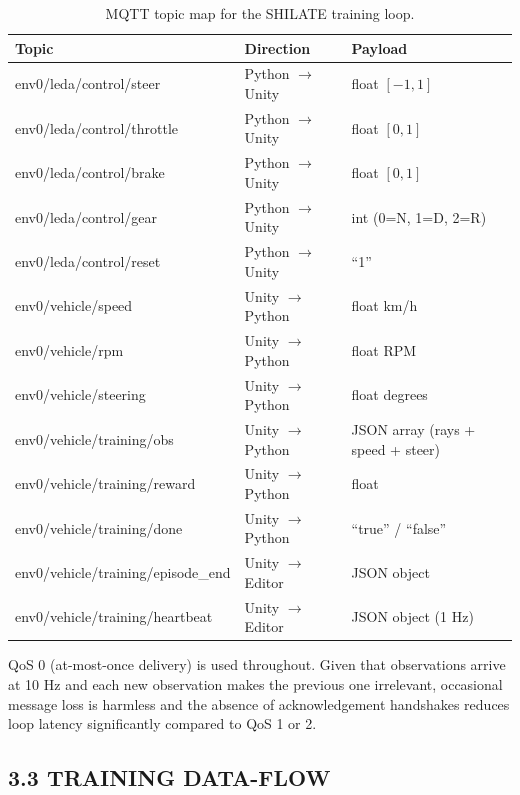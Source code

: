 \documentclass[12pt,a4paper]{article}
\begin{document}
\begin{table}[H]
  \centering
  \caption{MQTT topic map for the SHILATE training loop.}
  \label{tab:mqtt-topics}
  \vspace{0.5\baselineskip}
  \begin{tabular}{>{\ttfamily}lll}
    \toprule
    \textbf{Topic} & \textbf{Direction} & \textbf{Payload} \\
    \midrule
    env0/leda/control/steer    & Python $\to$ Unity & float $[-1, 1]$ \\
    env0/leda/control/throttle & Python $\to$ Unity & float $[0, 1]$ \\
    env0/leda/control/brake    & Python $\to$ Unity & float $[0, 1]$ \\
    env0/leda/control/gear     & Python $\to$ Unity & int (0=N, 1=D, 2=R) \\
    env0/leda/control/reset    & Python $\to$ Unity & ``1'' \\
    env0/vehicle/speed         & Unity $\to$ Python & float km/h \\
    env0/vehicle/rpm           & Unity $\to$ Python & float RPM \\
    env0/vehicle/steering      & Unity $\to$ Python & float degrees \\
    env0/vehicle/training/obs  & Unity $\to$ Python & JSON array (rays + speed + steer) \\
    env0/vehicle/training/reward & Unity $\to$ Python & float \\
    env0/vehicle/training/done & Unity $\to$ Python & ``true'' / ``false'' \\
    env0/vehicle/training/episode\_end & Unity $\to$ Editor & JSON object \\
    env0/vehicle/training/heartbeat    & Unity $\to$ Editor & JSON object (1 Hz) \\
    \bottomrule
  \end{tabular}
\end{table}

QoS 0 (at-most-once delivery) is used throughout. Given that observations
arrive at 10 Hz and each new observation makes the previous one irrelevant,
occasional message loss is harmless and the absence of acknowledgement
handshakes reduces loop latency significantly compared to QoS 1 or 2.

\subsection*{3.3 \quad TRAINING DATA-FLOW}
\end{document}
